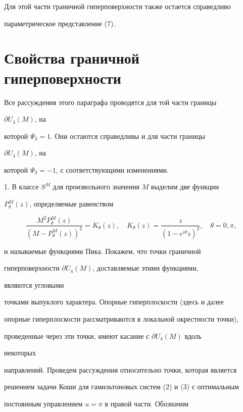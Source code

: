 Для этой части граничной гиперповерхности также остается справедливо


параметрическое представление (7).





\section{Свойства граничной гиперповерхности}





Все рассуждения этого параграфа проводятся для той части границы


$\partial U_4(M)$, на


которой $\Psi_3=1$. Они остаются справедливы и для части границы


$\partial U_4(M)$, на


которой $\Psi_3=-1$, с соответствующими изменениями.


\medskip





1. В классе $S^M$ для произвольного значения $M$ выделим две функции


$P^M_\theta(z)$, определяемые равенством


$$


\frac{M^2P^M_\theta(z)}{(M-P^M_\theta(z))^2}=K_\theta(z),\quad


K_\theta(z)=\frac{z}{(1-e^{i\theta}z)^2},\quad \theta=0,\pi,


$$


и называемые функциями Пика. Покажем, что точки граничной


гиперповерхности $\partial U_4(M)$, доставляемые этими функциями,


являются угловыми


точками выпуклого характера. Опорные гиперплоскости (здесь и далее


опорные гиперплоскости рассматриваются в локальной окрестности точки),


проведенные через эти точки, имеют касание с $\partial U_4(M)$ вдоль


некоторых


направлений. Проведем рассуждения относительно точки, которая является


решением задачи Коши для гамильтоновых систем (2) и (3) с оптимальным


постоянным управлением $u=\pi$ в правой части. Обозначим


